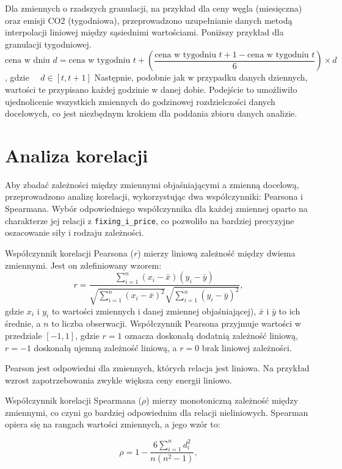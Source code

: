Dla zmiennych o rzadszych granulacji, na przykład dla ceny węgla (miesięczna) oraz emisji CO2 (tygodniowa), przeprowadzono uzupełnianie danych metodą interpolacji liniowej między sąsiednimi wartościami. Poniższy przykład dla granulacji tygodniowej.
\[
\text{cena w dniu } d = \text{cena w tygodniu } t + \left( \frac{\text{cena w tygodniu } t+1 - \text{cena w tygodniu } t}{6} \right) \times d
\]
, gdzie \( \quad d \in [t, t+1] \) \newline
Następnie, podobnie jak w przypadku danych dziennych, wartości te przypisano każdej godzinie w danej dobie. Podejście to umożliwiło ujednolicenie wszystkich zmiennych do godzinowej rozdzielczości danych docelowych, co jest niezbędnym krokiem dla poddania zbioru danych analizie.

\section{Analiza korelacji}

Aby zbadać zależności między zmiennymi objaśniającymi a zmienną docelową, przeprowadzono analizę korelacji, wykorzystując dwa współczynniki: Pearsona i Spearmana. Wybór odpowiedniego współczynnika dla każdej zmiennej oparto na charakterze jej relacji z \texttt{fixing\_i\_price}, co pozwoliło na bardziej precyzyjne oszacowanie siły i rodzaju zależności.

Współczynnik korelacji Pearsona (\( r \)) mierzy liniową zależność między dwiema zmiennymi. Jest on zdefiniowany wzorem:
\[
r = \frac{\sum_{i=1}^{n} (x_i - \bar{x})(y_i - \bar{y})}{\sqrt{\sum_{i=1}^{n} (x_i - \bar{x})^2} \sqrt{\sum_{i=1}^{n} (y_i - \bar{y})^2}},
\]
gdzie \( x_i \) i \( y_i \) to wartości zmiennych i danej zmiennej objaśniającej), \( \bar{x} \) i \( \bar{y} \) to ich średnie, a \( n \) to liczba obserwacji. Współczynnik Pearsona przyjmuje wartości w przedziale \([-1, 1]\), gdzie \( r = 1 \) oznacza doskonałą dodatnią zależność liniową, \( r = -1 \) doskonałą ujemną zależność liniową, a \( r = 0 \) brak liniowej zależności.

Pearson jest odpowiedni dla zmiennych, których relacja jest liniowa. Na przykład wzrost zapotrzebowania zwykle większa ceny energii liniowo.

Współczynnik korelacji Spearmana (\( \rho \)) mierzy monotoniczną zależność między zmiennymi, co czyni go bardziej odpowiednim dla relacji nieliniowych. Spearman opiera się na rangach wartości zmiennych, a jego wzór to:

\[
\rho = 1 - \frac{6 \sum_{i=1}^{n} d_i^2}{n(n^2 - 1)},
\]

